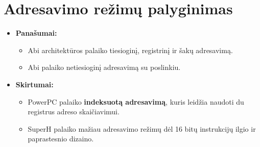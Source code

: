 \documentclass{article}
\begin{document}
\section*{Adresavimo režimų palyginimas}
\begin{itemize}
    \item \textbf{Panašumai:}
        \begin{itemize}
            \item Abi architektūros palaiko tiesioginį, registrinį ir šakų adresavimą.
            \item Abi palaiko netiesioginį adresavimą su poslinkiu.
        \end{itemize}
    \item \textbf{Skirtumai:}
        \begin{itemize}
            \item PowerPC palaiko \textbf{indeksuotą adresavimą}, kuris leidžia naudoti du registrus adreso skaičiavimui.
            \item SuperH palaiko mažiau adresavimo režimų dėl 16 bitų instrukcijų ilgio ir paprastesnio dizaino.
        \end{itemize}
\end{itemize}


 
\end{document}
